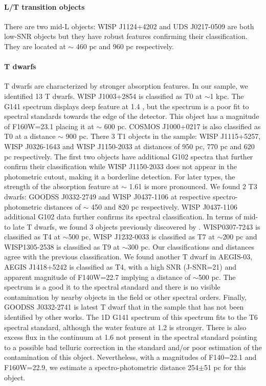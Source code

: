 \documentclass[manuscript]{aastex63}
\begin{document}
\paragraph{L/T transition objects}
There are two mid-L objects: WISP J1124+4202 and UDS J0217-0509 are both low-SNR objects but they have robust \wat features confirming their classification. They are located at $\sim$ 460 pc and 960 pc respectively.

\paragraph{T dwarfs}
T dwarfs are characterized by stronger \wat absorption \meth features. In our sample, we identified 13 T dwarfs. WISP J1003+2854 is classified as T0 at $\sim$1 kpc. The G141 spectrum displays deep \wat feature at 1.4 \micron, but the spectrum is a poor fit to spectral standards towards the edge of the detector. This object has a magnitude of F160W=23.1 placing it at $\sim$ 600 pc. COSMOS J1000+0217 is also classified as T0 at a distance $\sim$ 900 pc. There 3 T1 objects in the sample: WISP J1115+5257, WISP J0326-1643 and WISP J1150-2033 at distances of 950 pc, 770 pc and 620 pc respectively. The first two objects have additional G102 spectra that further confirm their classification while WISP J1150-2033 does not appear in the photometric cutout, making it a borderline detection. For later types, the strength of the \meth absorption feature at $\sim$ 1.61 \micron is more pronounced. We found 2 T3 dwarfs: GOODSS J0332-2749 and WISP J0437-1106 at respective spectro-photometric distances of $\sim$ 450 and 820 pc respectively.  WISP J0437-1106 additional G102 data further confirms its spectral classification. In terms of mid-to late T dwarfs, we found 3 objects previously discovered by \cite{2012ApJ...752L..14M}. WISP0307-7243 is classified as T4 at $\sim$500 pc, WISP J1232-0033 is classified as T7 at $\sim$200 pc and  WISP1305-2538 is classified as T9 at $\sim$300 pc. Our classifications and distances agree with the previous classification. We found another T dwarf in AEGIS-03, AEGIS J1418+5242 is classified as T4, with a high SNR (J-SNR=21) and apparent magnitude of F140W=22.7 implying a distance of $\sim$500 pc. The spectrum is a good it to the spectral standard and there is no visible contamination by nearby objects in the field or other spectral orders. Finally, GOODSS J0332-2741 is latest T dwarf that in the sample that has not been identified by other works. The 1D G141 spectrum of this spectrum fits to the T6 spectral standard, although the water feature at 1.2 \micron is stronger. There is also excess flux in the continuum at 1.6 \micron not present in the spectral standard pointing to a possible bad telluric correction in the standard and/or poor estimation of the contamination of this object. Nevertheless, with a magnitudes of F140=22.1 and F160W=22.9, we estimate a spectro-photometric distance 254$\pm$51 pc for this object. 
\end{document}
